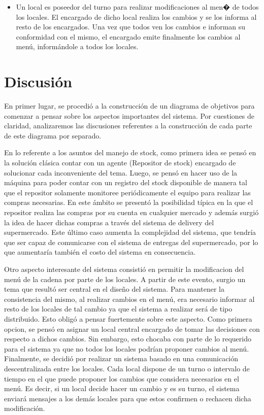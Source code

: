 \documentclass[a4paper,11pt] {article}
\begin{document}
\begin{itemize}
    \item Un local es poseedor del turno para realizar modificaciones al men� de todos los locales. El encargado de dicho local realiza los cambios y se los informa al resto de los encargados. Una vez que todos ven los cambios e informan su conformidad con el mismo, el encargado emite finalmente los cambios al men\'u, inform\'andole a todos los locales.
\end{itemize}

\section*{Discusi\'on}

En primer lugar, se procedi\'o a la construcci\'on de un diagrama de objetivos para comenzar a pensar sobre los aspectos importantes del sistema. Por cuestiones de claridad, analizaremos las discusiones referentes a la construcci\'on de cada parte de este diagrama por separado.

En lo referente a los asuntos del manejo de stock, como primera idea se pens\'o en la soluci\'on cl\'asica contar con un agente (Repositor de stock) encargado de solucionar cada inconveniente del tema. Luego, se pens\'o en hacer uso de la m\'aquina para poder contar con un registro del stock disponible de manera tal que el repositor solamente monitoree peri\'odicamente el equipo para realizar las compras necesarias. En este \'ambito se present\'o la posibilidad t\'ipica en la que el repositor realiza las compras por su cuenta en cualquier mercado y adem\'as surgi\'o la idea de hacer dichas compras a trav\'es del sistema de delivery del supermercado. Este \'ultimo caso aumenta la complejidad del sistema, que tendr\'ia que ser capaz de comunicarse con el sistema de entregas del supermercado, por lo que aumentar\'ia tambi\'en el costo del sistema en consecuencia.

Otro aspecto interesante del sistema consisti\'o en permitir la modificacion del men\'u de la cadena por parte de los locales. A partir de este evento, surgio un tema que result\'o ser central en el dise\~no del sistema. Para mantener la consistencia del mismo, al realizar cambios en el men\'u, era necesario informar al resto de los locales de tal cambio ya que el sistema a realizar ser\'a de tipo distribuido. Esto oblig\'o a pensar fuertemente sobre este aspecto. Como primera opcion, se pens\'o en asignar un local central encargado de tomar las decisiones con respecto a dichos cambios. Sin embargo, esto chocaba con parte de lo requerido para el sistema ya que no todos los locales podr\'ian proponer cambios al men\'u. Finalmente, se decidi\'o por realizar un sistema basado en una comunicaci\'on descentralizada entre los locales. Cada local dispone de un turno o intervalo de tiempo en el que puede proponer los cambios que considera necesarios en el men\'u. Es decir, si un local decide hacer un cambio y es su turno, el sistema enviar\'a mensajes a los dem\'as locales para que estos confirmen o rechacen dicha modificaci\'on.
 
\end{document}
